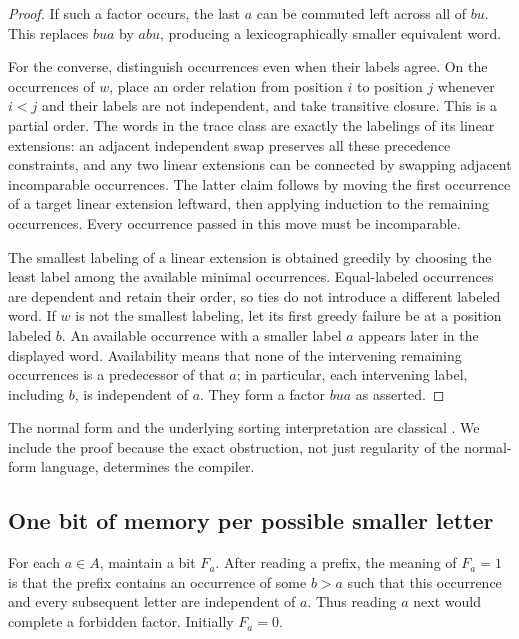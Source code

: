 \documentclass[11pt,a4paper]{article}
\theoremstyle{definition}
\theoremstyle{remark}
\begin{document}
\begin{proof}
If such a factor occurs, the last $a$ can be commuted left across all of $bu$.
This replaces $bua$ by $abu$, producing a lexicographically smaller equivalent
word.

For the converse, distinguish occurrences even when their labels agree. On
the occurrences of $w$, place an order relation from position $i$ to position
$j$ whenever $i<j$ and their labels are not independent, and take transitive
closure. This is a partial order. The words in the trace class are exactly
the labelings of its linear extensions: an adjacent independent swap
preserves all these precedence constraints, and any two linear extensions
can be connected by swapping adjacent incomparable occurrences. The latter
claim follows by moving the first occurrence of a target linear extension
leftward, then applying induction to the remaining occurrences. Every
occurrence passed in this move must be incomparable.

The smallest labeling of a linear extension is obtained greedily by choosing
the least label among the available minimal occurrences. Equal-labeled
occurrences are dependent and retain their order, so ties do not introduce
a different labeled word. If $w$ is not the smallest labeling, let its first
greedy failure be at a position labeled $b$. An available occurrence with a
smaller label $a$ appears later in the displayed word. Availability means
that none of the intervening remaining occurrences is a predecessor of that
$a$; in particular, each intervening label, including $b$, is independent of
$a$. They form a factor $bua$ as asserted.
\end{proof}

The normal form and the underlying sorting interpretation are classical
\cite{anisimov-knuth}. We include the proof because the exact obstruction,
not just regularity of the normal-form language, determines the compiler.

\subsection{One bit of memory per possible smaller letter}

For each $a\in A$, maintain a bit $F_a$. After reading a prefix, the meaning of
$F_a=1$ is that the prefix contains an occurrence of some $b>a$ such that
this occurrence and every subsequent letter are independent of $a$. Thus
reading $a$ next would complete a forbidden factor. Initially $F_a=0$.
\end{document}
